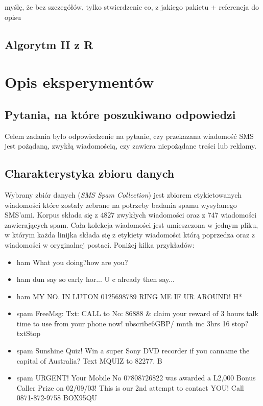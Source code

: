\documentclass[a4paper,12pt]{article}
\begin{document}
myślę, że bez szczegółów, tylko stwierdzenie co, z jakiego pakietu + referencja do opisu

\subsection{Algorytm II z R}

\section{Opis eksperymentów}

\subsection{Pytania, na które poszukiwano odpowiedzi}

Celem zadania było odpowiedzenie na pytanie, czy przekazana wiadomość SMS jest pożądaną, zwykłą wiadomością, czy zawiera niepożądane treści lub reklamy.

\subsection{Charakterystyka zbioru danych}\label{dane:charakterystyka}

Wybrany zbiór danych (\textit{SMS Spam Collection}) jest zbiorem etykietowanych wiadomości które zostały zebrane na potrzeby badania spamu wysyłanego SMS'ami. Korpus składa się z $4827$ zwykłych wiadomości oraz z $747$ wiadomości zawierających spam. Cała kolekcja wiadomości jest umieszczona w jednym pliku, w którym każda linijka składa się z etykiety wiadomości którą poprzedza oraz z wiadomości w oryginalnej postaci. Poniżej kilka przykładów:

\begin{itemize}
	\item ham What you doing?how are you? 
	\item ham dun say so early hor... U c already then say... 
	\item ham MY NO. IN LUTON 0125698789 RING ME IF UR AROUND! H* 
	\item spam FreeMsg: Txt: CALL to No: 86888 \& claim your reward of 3 hours talk time to use from your phone now! ubscribe6GBP/ mnth inc 3hrs 16 stop?txtStop 
	\item spam Sunshine Quiz! Win a super Sony DVD recorder if you canname the capital of Australia? Text MQUIZ to 82277. B 
	\item spam URGENT! Your Mobile No 07808726822 was awarded a L2,000 Bonus Caller Prize on 02/09/03! This is our 2nd attempt to contact YOU! Call 0871-872-9758 BOX95QU 
\end{itemize}
\end{document}
